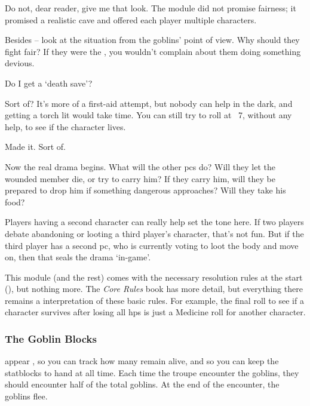 \begin{multicols}{2}
\bigLine
\vspace{2em}
\noindent
Do not, dear reader, give me that look.
The module did not promise fairness; it promised a realistic cave and offered each player multiple characters.

Besides -- look at the situation from the goblins' point of view.
Why should they fight fair?
If they were the , you wouldn't complain about them doing something devious.

\bigLine

\null
\begin{description}\sf
  \item[Player 3:]
  Do I get a `death save'?
  \item[\Glsentrytext{gm}:]
  Sort of?
  It's more of a first-aid attempt, but nobody can help in the dark, and getting a torch lit would take time.
  You can still try to roll at ~7, without any help, to see if the character lives.
  \item[Player 3:]
  Made it.
  Sort of.
\end{description}

\bigLine
\vspace{2em}

\noindent
Now the real drama begins.
What will the other \glspl{pc} do?
Will they let the wounded member die, or try to carry him?
If they carry him, will they be prepared to drop him if something dangerous approaches?
Will they take his food?

Players having a second character can really help set the tone here.
If two players debate abandoning or looting a third player's character, that's not fun.
But if the third player has a second \gls{pc}, who is currently voting to loot the body and move on, then that seals the drama `in-game'.

\bigLine

This module (and the rest) comes with the necessary resolution rules at the start (), but nothing more.
The \textit{Core Rules} book has more detail, but everything there remains a interpretation of these basic rules.
For example, the final roll to see if a character survives after losing all \glspl{hp} is just a Medicine roll for another character.

\subsubsection{The Goblin Blocks}
appear , so you can track how many remain alive, and so you can keep the \glspl{statblock} to hand at all time.
Each time the troupe encounter the goblins, they should encounter half of the total goblins.
At the end of the encounter, the goblins flee.

\end{multicols}

